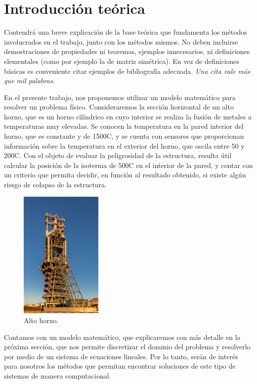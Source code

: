 \section{Introducción teórica}

  {\color{Gray} Contendrá una breve explicación de la base teórica que fundamenta los métodos involucrados en el trabajo, junto con los métodos mismos. No deben incluirse demostraciones de propiedades ni teoremas, ejemplos innecesarios, ni definiciones elementales (como por ejemplo la de matriz simétrica). En vez de definiciones básicas es conveniente citar ejemplos de bibliografía adecuada. \emph{Una cita vale más que mil palabras.}}

  En el presente trabajo, nos proponemos utilizar un modelo matemático para resolver un problema físico. Consideraremos la sección horizontal de un alto horno, que es un horno cilíndrico en cuyo interior se realiza la fusión de metales a temperaturas muy elevadas. Se conocen la temperatura en la pared interior del horno, que es constante y de 1500{\degree}C, y se cuenta con sensores que proporcionan información sobre la temperatura en el exterior del horno, que oscila entre 50 y 200{\degree}C. Con el objeto de evaluar la peligrosidad de la estructura, resulta útil calcular la posición de la isoterma de 500{\degree}C en el interior de la pared, y contar con un criterio que permita decidir, en función al resultado obtenido, si existe algún riesgo de colapso de la estructura.

  \begin{figure}[h]
    \centering
    \includegraphics[width=4cm]{altoHorno.jpg}
    \caption{Alto horno.}
  \end{figure}

  Contamos con un modelo matemático, que explicaremos con más detalle en la próxima sección, que nos permite discretizar el dominio del problema y resolverlo por medio de un sistema de ecuaciones lineales. Por lo tanto, serán de interés para nosotros los métodos que permitan encontrar soluciones de este tipo de sistemas de manera computacional.


